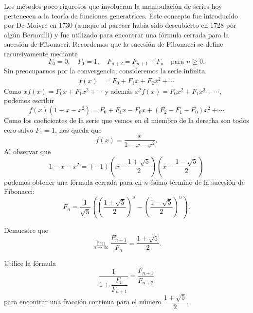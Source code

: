Los métodos poco rigurosos que involucran la manipulación de series hoy pertenecen a la teoría de funciones generatrices. Este concepto 
fue introducido por De Moivre en 1730 (aunque al parecer había sido descubierto
en 1728 por algún Bernoulli)
y fue utilizado para encontrar una fórmula cerrada para la sucesión de Fibonacci. Recordemos que la sucesión de Fibonacci
se define recursivamente mediante 
\[
	F_0=0,\quad
	F_1=1,\quad
	F_{n+2}=F_{n+1}+F_n\quad\text{para $n\geq 0$}.
\]
Sin preocuparnos por la convergencia, 
consideremos la serie infinita
\begin{align*}
	f(x)&=F_0+F_1x+F_2x^2+\cdots
\end{align*}
Como $xf(x)=F_0x+F_1x^2+\cdots$ y además $x^2f(x)=F_0x^2+F_1x^3+\cdots$, podemos escribir
\[
	f(x)(1-x-x^2)=F_0+F_1x-F_0x+(F_2-F_1-F_0)x^2+\cdots
\]
Como los coeficientes de la serie que vemos en el miembro de la derecha son todos cero salvo $F_1=1$, nos queda
que
\[
	f(x)=\frac{x}{1-x-x^2}.
\]
Al observar que
\[
	1-x-x^2=(-1)\left(x-\frac{1+\sqrt{5}}{2}\right)\left(x-\frac{1-\sqrt{5}}{2}\right)
\]
podemos obtener una fórmula cerrada para en $n$-ésimo término de la sucesión de Fibonacci:
\[
	F_n=\frac{1}{\sqrt{5}}\left( \left(\frac{1+\sqrt{5}}{2}\right)^n-\left(\frac{1-\sqrt{5}}{2}\right)^n\right).
\]

\begin{exercise}
	Demuestre que 
	\[
		\lim_{n\to\infty}\frac{F_{n+1}}{F_n}=\frac{1+\sqrt{5}}{2}.
	\]
\end{exercise}

\begin{exercise}
	Utilice la fórmula
	\[
		\dfrac{1}{1+\dfrac{F_n}{F_{n+1}}}=\dfrac{F_{n+1}}{F_{n+2}}
	\]
	para encontrar una fracción continua para el número $\dfrac{1+\sqrt{5}}{2}$. 
\end{exercise}



